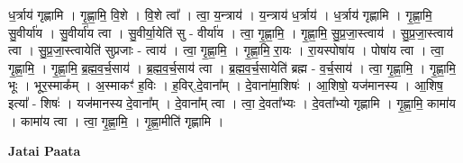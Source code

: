 \documentclass[17pt]{extarticle}
\begin{document}
ध॒र्त्राय॑ गृह्णामि । गृ॒ह्णा॒मि॒ वि॒शे । वि॒शे त्वा᳚ । त्वा॒ य॒न्त्राय॑ । य॒न्त्राय॑ ध॒र्त्राय॑ । ध॒र्त्राय॑ गृह्णामि । गृ॒ह्णा॒मि॒ सु॒वीर्या॑य । सु॒वीर्या॑य त्वा । सु॒वीर्या॒येति॑ सु - वीर्या॑य । त्वा॒ गृ॒ह्णा॒मि॒ । गृ॒ह्णा॒मि॒ सु॒प्र॒जा॒स्त्वाय॑ । सु॒प्र॒जा॒स्त्वाय॑ त्वा । सु॒प्र॒जा॒स्त्वायेति॑ सुप्रजाः - त्वाय॑ । त्वा॒ गृ॒ह्णा॒मि॒ । गृ॒ह्णा॒मि॒ रा॒यः । रा॒यस्पोषा॑य । पोषा॑य त्वा । त्वा॒ गृ॒ह्णा॒मि॒ । गृ॒ह्णा॒मि॒ ब्र॒ह्म॒व॒र्च॒साय॑ । ब्र॒ह्म॒व॒र्च॒साय॑ त्वा । ब्र॒ह्म॒व॒र्च॒सायेति॑ ब्रह्म - व॒र्च॒साय॑ । त्वा॒ गृ॒ह्णा॒मि॒ । गृ॒ह्णा॒मि॒ भूः । भूर॒स्माक᳚म् । अ॒स्माकꣳ॑ ह॒विः । ह॒विर्,दे॒वाना᳚म् । दे॒वाना॑मा॒शिषः॑ । आ॒शिषो॒ यज॑मानस्य । आ॒शिष॒ इत्या᳚ - शिषः॑ । यज॑मानस्य दे॒वाना᳚म् । दे॒वाना᳚म् त्वा । त्वा॒ दे॒वता᳚भ्यः । दे॒वता᳚भ्यो गृह्णामि । गृ॒ह्णा॒मि॒ कामा॑य । कामा॑य त्वा । त्वा॒ गृ॒ह्णा॒मि॒ । गृ॒ह्णा॒मीति॑ गृह्णामि । \newline

\textbf{Jatai Paata} \newline
\end{document}
